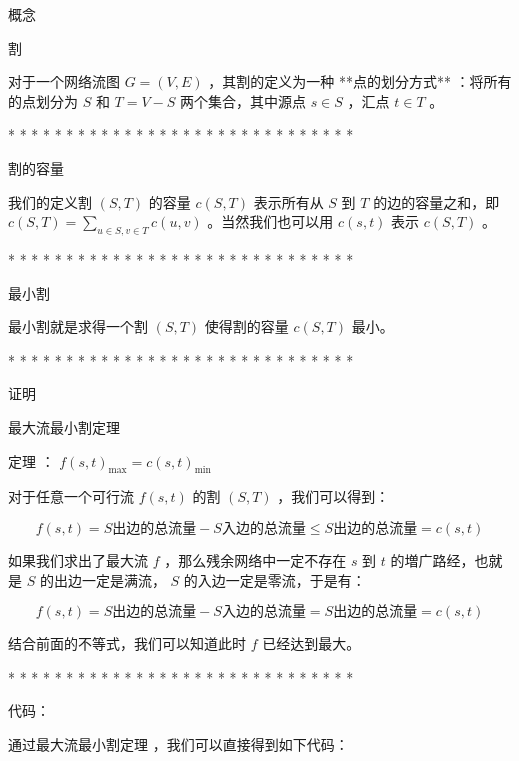 概念

割

对于一个网络流图 $G=(V,E)$ ，其割的定义为一种 **点的划分方式** ：将所有的点划分为 $S$ 和 $T=V-S$ 两个集合，其中源点 $s\in S$ ，汇点 $t\in T$ 。

* * * * * * * * * * * * * * * * * * * * * * * * * * * * * *

割的容量

我们的定义割 $(S,T)$ 的容量 $c(S,T)$ 表示所有从 $S$ 到 $T$ 的边的容量之和，即 $c(S,T)=\sum_{u\in S,v\in T}c(u,v)$ 。当然我们也可以用 $c(s,t)$ 表示 $c(S,T)$ 。

* * * * * * * * * * * * * * * * * * * * * * * * * * * * * *

最小割

最小割就是求得一个割 $(S,T)$ 使得割的容量 $c(S,T)$ 最小。

* * * * * * * * * * * * * * * * * * * * * * * * * * * * * *

证明

最大流最小割定理

定理 ： $f(s,t)_{\max}=c(s,t)_{\min}$ 

对于任意一个可行流 $f(s,t)$ 的割 $(S,T)$ ，我们可以得到：

$$
f(s,t)=S\text{出边的总流量}-S\text{入边的总流量}\le S\text{出边的总流量}=c(s,t)
$$

如果我们求出了最大流 $f$ ，那么残余网络中一定不存在 $s$ 到 $t$ 的増广路经，也就是 $S$ 的出边一定是满流， $S$ 的入边一定是零流，于是有：

$$
f(s,t)=S\text{出边的总流量}-S\text{入边的总流量}=S\text{出边的总流量}=c(s,t)
$$

结合前面的不等式，我们可以知道此时 $f$ 已经达到最大。

* * * * * * * * * * * * * * * * * * * * * * * * * * * * * *


代码：

通过最大流最小割定理 ，我们可以直接得到如下代码：

